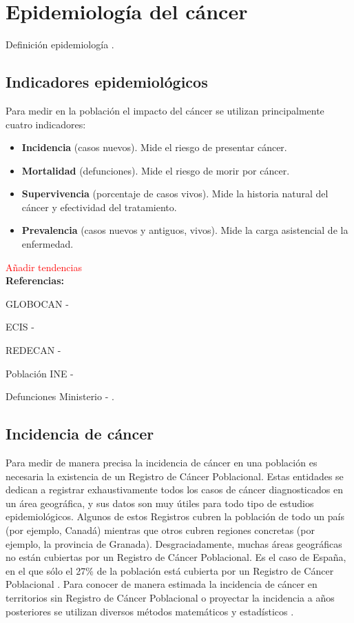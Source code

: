 \chapter{Epidemiología del cáncer}

Definición epidemiología \cite{IARC1999}.

\section{Indicadores epidemiológicos}

Para medir en la población el impacto del cáncer se utilizan principalmente cuatro indicadores:

\begin{itemize}
	\item \textbf{Incidencia} (casos nuevos). Mide el riesgo de presentar cáncer.
	\item \textbf{Mortalidad} (defunciones). Mide el riesgo de morir por cáncer.
	\item \textbf{Supervivencia} (porcentaje de casos vivos). Mide la historia natural del cáncer y efectividad del tratamiento.
	\item \textbf{Prevalencia} (casos nuevos y antiguos, vivos). Mide la carga asistencial de la enfermedad.
\end{itemize}

\textcolor{red}{Añadir tendencias}\\


\textbf{Referencias:}

GLOBOCAN - \cite{Bray2018, GCO}

ECIS - \cite{ECIS, ECIS2}

REDECAN - \cite{REDECAN2020}

Población INE - \cite{INEpob}

Defunciones Ministerio - \cite{MSCBS}.

\section{Incidencia de cáncer}

Para medir de manera precisa la incidencia de cáncer en una población es necesaria la existencia de un Registro de Cáncer Poblacional. Estas entidades se dedican a registrar exhaustivamente todos los casos de cáncer diagnosticados en un área geográfica, y sus datos son muy útiles para todo tipo de estudios epidemiológicos. Algunos de estos Registros cubren la población de todo un país (por ejemplo, Canadá) mientras que otros cubren regiones concretas (por ejemplo, la provincia de Granada). Desgraciadamente, muchas áreas geográficas no están cubiertas por un Registro de Cáncer Poblacional. Es el caso de España, en el que sólo el 27\% de la población está cubierta por un Registro de Cáncer Poblacional \cite{Redondo-Sanchez2019}. Para conocer de manera estimada la incidencia de cáncer en territorios sin Registro de Cáncer Poblacional o proyectar la incidencia a años posteriores se utilizan diversos métodos matemáticos y estadísticos \cite{Bray2018, GCO, ECIS, ECIS2, REDECAN2020, Redondo-Sanchez2019}.\\

